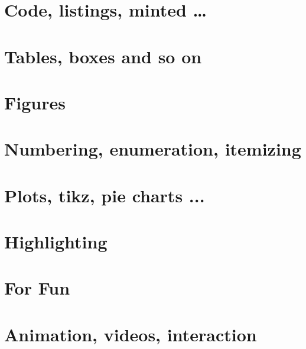 \documentclass[12pt]{article}
\begin{document}
\section{Code, listings, minted \dots}


 
\clearpage
\section{Tables, boxes and so on}


\clearpage
\section{Figures}


\clearpage
\section{Numbering, enumeration, itemizing}


\clearpage
\section{Plots, tikz, pie charts ...}

\clearpage
\section{Highlighting}

 
\clearpage
\section{For Fun}


\clearpage
\section{ Animation, videos, interaction}

\end{document}
